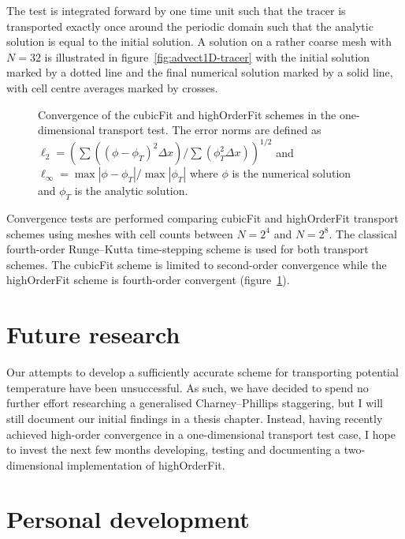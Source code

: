\documentclass[a4paper,11pt]{article}
\begin{document}
The test is integrated forward by one time unit such that the tracer is transported exactly once around the periodic domain such that the analytic solution is equal to the initial solution.  A solution on a rather coarse mesh with $N = 32$ is illustrated in figure~\ref{fig:advect1D-tracer} with the initial solution marked by a dotted line and the final numerical solution marked by a solid line, with cell centre averages marked by crosses.

\begin{figure}
	\centering
	
	\caption{Convergence of the cubicFit and highOrderFit schemes in the one-dimensional transport test.
	The error norms are defined as $\ell_2 = \left( \sum \left( \left( \phi - \phi_T \right)^2 \Delta x \right) / \sum \left( \phi_T^2 \Delta x \right)\right)^{1/2}$ and $\ell_\infty = \max \left| \phi - \phi_T \right| / \max \left| \phi_T \right|$ where $\phi$ is the numerical solution and $\phi_T$ is the analytic solution.}
	\label{fig:advect1D-convergence}
\end{figure}

Convergence tests are performed comparing cubicFit and highOrderFit transport schemes using meshes with cell counts between $N = 2^4$ and $N = 2^8$.  The classical fourth-order Runge--Kutta time-stepping scheme \citep[p. 53]{durran2013} is used for both transport schemes.  The cubicFit scheme is limited to second-order convergence while the highOrderFit scheme is fourth-order convergent (figure~\ref{fig:advect1D-convergence}).

\section{Future research}

Our attempts to develop a sufficiently accurate scheme for transporting potential temperature have been unsuccessful.
As such, we have decided to spend no further effort researching a generalised Charney--Phillips staggering, but I will still document our initial findings in a thesis chapter.
Instead, having recently achieved high-order convergence in a one-dimensional transport test case, I hope to invest the next few months developing, testing and documenting a two-dimensional implementation of highOrderFit.

\section{Personal development}
\end{document}

